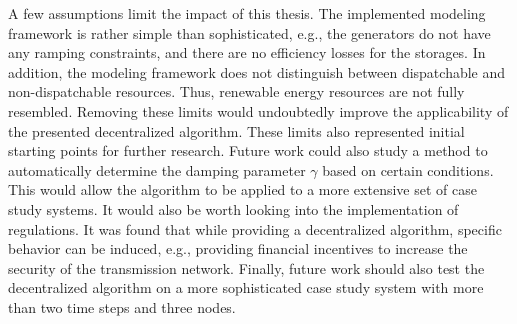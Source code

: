 A few assumptions limit the impact of this thesis. The implemented modeling framework is rather simple than sophisticated, e.g., the generators do not have any ramping constraints, and there are no efficiency losses for the storages. In addition, the modeling framework does not distinguish between dispatchable and non-dispatchable resources. Thus, renewable energy resources are not fully resembled. Removing these limits would undoubtedly improve the applicability of the presented decentralized algorithm. These limits also represented initial starting points for further research. Future work could also study a method to automatically determine the damping parameter $\gamma$ based on certain conditions. This would allow the algorithm to be applied to a more extensive set of case study systems. It would also be worth looking into the implementation of regulations. It was found that while providing a decentralized algorithm, specific behavior can be induced, e.g., providing financial incentives to increase the security of the transmission network. Finally, future work should also test the decentralized algorithm on a more sophisticated case study system with more than two time steps and three nodes.